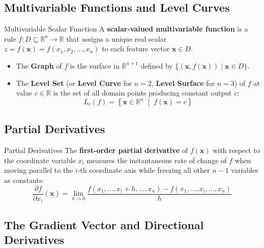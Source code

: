 \subsection{Multivariable Functions and Level Curves}

\begin{definitionbox}{Multivariable Scalar Function}
A \textbf{scalar-valued multivariable function} is a rule $f: D \subseteq \mathbb{R}^n \to \mathbb{R}$ that assigns a unique real scalar $z = f(\mathbf{x}) = f(x_1, x_2, \dots, x_n)$ to each feature vector $\mathbf{x} \in D$.
\begin{itemize}
    \item The \textbf{Graph} of $f$ is the surface in $\mathbb{R}^{n+1}$ defined by $\{(\mathbf{x}, f(\mathbf{x})) \mid \mathbf{x} \in D\}$.
    \item The \textbf{Level Set} (or \textbf{Level Curve} for $n=2$, \textbf{Level Surface} for $n=3$) of $f$ at value $c \in \mathbb{R}$ is the set of all domain points producing constant output $c$:
    \begin{equation}
    L_c(f) = \left\{ \mathbf{x} \in \mathbb{R}^n \;\middle|\; f(\mathbf{x}) = c \right\}
    \end{equation}
\end{itemize}
\end{definitionbox}

\subsection{Partial Derivatives}

\begin{definitionbox}{Partial Derivatives}
The \textbf{first-order partial derivative} of $f(\mathbf{x})$ with respect to the coordinate variable $x_i$ measures the instantaneous rate of change of $f$ when moving parallel to the $i$-th coordinate axis while freezing all other $n-1$ variables as constants:
\begin{equation}
\frac{\partial f}{\partial x_i}(\mathbf{x}) = \lim_{h \to 0} \frac{f(x_1, \dots, x_i + h, \dots, x_n) - f(x_1, \dots, x_i, \dots, x_n)}{h}
\end{equation}
\end{definitionbox}

\subsection{The Gradient Vector and Directional Derivatives}

